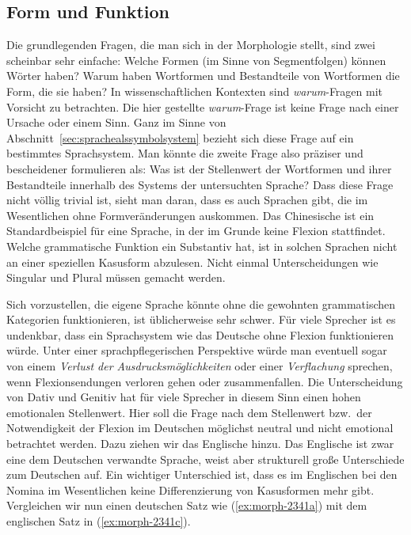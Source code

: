 \label{sec:morphkond}

\subsection{Form und Funktion}

\label{sec:morphgrundl}

Die grundlegenden Fragen, die man sich in der Morphologie stellt, sind zwei scheinbar sehr einfache:
Welche Formen (im Sinne von Segmentfolgen) können Wörter haben?
Warum haben Wortformen und Bestandteile von Wortformen die Form, die sie haben?
In wissenschaftlichen Kontexten sind \textit{warum}-Fragen mit Vorsicht zu betrachten.
Die hier gestellte \textit{warum}-Frage ist keine Frage nach einer Ursache oder einem Sinn.
Ganz im Sinne von Abschnitt~\ref{sec:sprachealssymbolsystem} bezieht sich diese Frage auf ein bestimmtes Sprachsystem.
Man könnte die zweite Frage also präziser und bescheidener formulieren als:
Was ist der Stellenwert der Wortformen und ihrer Bestandteile innerhalb des Systems der untersuchten Sprache?
Dass diese Frage nicht völlig trivial ist, sieht man daran, dass es auch Sprachen gibt, die im Wesentlichen ohne Formveränderungen auskommen.
Das Chinesische ist ein Standardbeispiel für eine Sprache, in der im Grunde keine Flexion stattfindet.
Welche grammatische Funktion \zB ein Substantiv hat, ist in solchen Sprachen nicht an einer speziellen Kasusform abzulesen.
Nicht einmal Unterscheidungen wie Singular und Plural müssen gemacht werden.

Sich vorzustellen, die eigene Sprache könnte ohne die gewohnten grammatischen Kategorien funktionieren, ist üblicherweise sehr schwer.
Für viele Sprecher ist es \zB undenkbar, dass ein Sprachsystem wie das Deutsche ohne Flexion funktionieren würde.
Unter einer sprachpflegerischen Perspektive würde man eventuell sogar von einem \textit{Verlust der Ausdrucksmöglichkeiten} oder einer \textit{Verflachung} sprechen, wenn Flexionsendungen verloren gehen oder zusammenfallen.
Die Unterscheidung von Dativ und Genitiv hat für viele Sprecher in diesem Sinn einen hohen emotionalen Stellenwert.
Hier soll die Frage nach dem Stellenwert bzw.\ der Notwendigkeit der Flexion im Deutschen möglichst neutral und nicht emotional betrachtet werden.
Dazu ziehen wir das Englische hinzu.
Das Englische ist zwar eine dem Deutschen verwandte Sprache, weist aber strukturell große Unterschiede zum Deutschen auf.
Ein wichtiger Unterschied ist, dass es im Englischen bei den Nomina im Wesentlichen keine Differenzierung von Kasusformen mehr gibt.
Vergleichen wir nun einen deutschen Satz wie (\ref{ex:morph-2341a}) mit dem englischen Satz in (\ref{ex:morph-2341c}).

